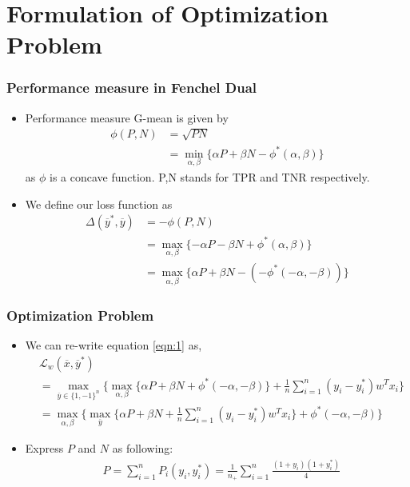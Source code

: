 \documentclass{beamer}
\begin{document}
\section{Formulation of Optimization Problem}
\begin{frame}
	\frametitle{Performance measure in Fenchel Dual}
	\begin{itemize}
	\item Performance measure G-mean is given by
	\begin{align*}
		\phi(P,N) &=\sqrt{PN}\\
		& = \min_{\alpha,\beta}\{\alpha P+\beta N - \phi^*(\alpha,\beta)\}
	\end{align*}
	as $\phi$ is a concave function. P,N stands for TPR and TNR respectively.
	\item We define our loss function as
	\begin{align*}
		\Delta(\overline{y}^*,\overline{y}) &= -\phi(P,N) \\
		&= \max_{\alpha,\beta}\{-\alpha P-\beta N + \phi^*(\alpha,\beta)\}\\
		&= \max_{\alpha,\beta}\{\alpha P+\beta N - (-\phi^*(-\alpha,-\beta))\}
	\end{align*}
	\end{itemize}
\end{frame}


\begin{frame}
	\frametitle{Optimization Problem}
	\begin{itemize}
	\item We can re-write equation \ref{eqn:1} as,
	\begin{align*}
	&\mathcal L_w(\overline{x},\overline{y}^*)\\
	&=\max_{\overline{y}\in\{1,-1\}^n}\{\max_{\alpha,\beta}\{\alpha P+\beta N +\phi^*(-\alpha,-\beta)\} + \frac{1}{n}\sum_{i=1}^n (y_i - y_i^*)w^Tx_i\}\\
	&=\max_{\alpha,\beta}\{\max_{\overline{y}}\{\alpha P+\beta N  + \frac{1}{n}\sum_{i=1}^n (y_i - y_i^*)w^Tx_i\}+\phi^*(-\alpha,-\beta)\}
	\end{align*}
	\item Express $P$ and $N$ as following:
	\begin{align*}
	&P = \sum_{i=1}^nP_i(y_i,y_i^*)= \frac{1}{n_+}\sum_{i=1}^n\frac{(1+y_i)(1+y_i^*)}{4}
	\end{align*}
	\end{itemize}
\end{frame}
\end{document}
